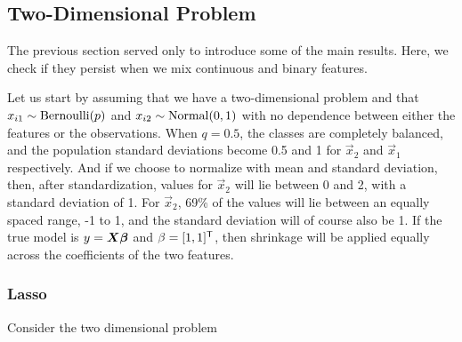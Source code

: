 \subsection{Two-Dimensional Problem}

The previous section served only to introduce some of the main results. Here, we check if they persist when we mix continuous and binary features.

Let us start by assuming that we have a two-dimensional problem and that \(x_{i1} \sim \operatorname{Bernoulli}(p)\) and \(x_{i2} \sim \operatorname{Normal}(0, 1)\) with no dependence between either the features or the observations. When \(q = 0.5\), the classes are completely balanced, and the population standard deviations become 0.5 and 1 for \(\vec{x}_2\) and \(\vec{x}_1\) respectively. And if we choose to normalize with mean and standard deviation, then, after standardization, values for \(\vec{x}_2\) will lie between 0 and 2, with a standard deviation of 1. For \(\vec{x}_2\), 69\% of the values will lie between an equally spaced range, -1 to 1, and the standard deviation will of course also be 1. If the true model is \(y = \boldsymbol{X}\boldsymbol{\beta}\) and \(\beta = [1,1]^{\mathsf{T}}\), then shrinkage will be applied equally across the coefficients of the two features.

\subsubsection{Lasso}
Consider the two dimensional problem

